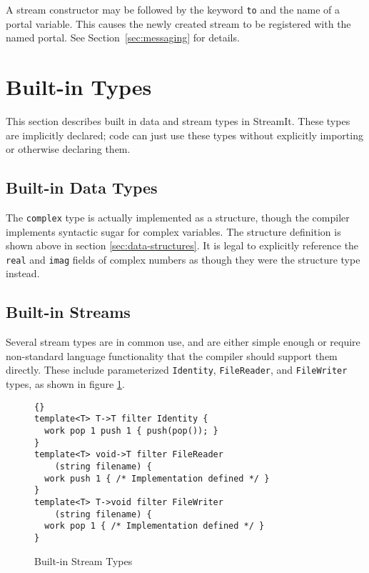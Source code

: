 \documentclass[11pt]{article}
\begin{document}
A stream constructor may be followed by the keyword \lstinline|to| and
the name of a portal variable.  This causes the newly created stream
to be registered with the named portal.  See
Section~\ref{sec:messaging} for details.

\section{Built-in Types}

This section describes built in data and stream types in StreamIt.
These types are implicitly declared; code can just use these types
without explicitly importing or otherwise declaring them.

\subsection{Built-in Data Types}

The \lstinline|complex| type is actually implemented as a structure,
though the compiler implements syntactic sugar for complex variables.
The structure definition is shown above in section
\ref{sec:data-structures}.
It is legal to explicitly reference the \lstinline|real| and
\lstinline|imag| fields of complex numbers as though they were the
structure type instead.

\subsection{Built-in Streams}

Several stream types are in common use, and are either simple enough
or require non-standard language functionality that the compiler
should support them directly.  These include parameterized
\lstinline|Identity|, \lstinline|FileReader|, and \lstinline|FileWriter| types, as
shown in figure \ref{fig:built-in-streams}.

\begin{figure}[htbp]
    \begin{lstlisting}{}
template<T> T->T filter Identity {
  work pop 1 push 1 { push(pop()); }
}
template<T> void->T filter FileReader
    (string filename) {
  work push 1 { /* Implementation defined */ }
}
template<T> T->void filter FileWriter
    (string filename) {
  work pop 1 { /* Implementation defined */ }
}
\end{lstlisting}
\vspace{-12pt}
    \caption{Built-in Stream Types}
    \label{fig:built-in-streams}
\end{figure}
\end{document}
